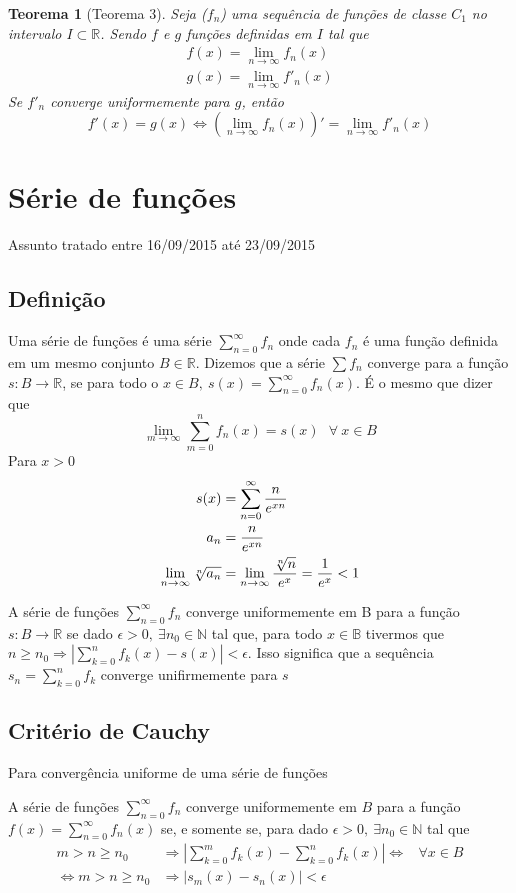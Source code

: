 \documentclass[12pt,openany, letterpaper]{book}
\newtheorem{theorem}{Teorema}[section]
\newcommand{\LI}[1][n]{\lim_{{#1} \rightarrow \infty}}
\newcommand{\soma}[2][n]{\sum_{{#1} = #2}^\infty}
\begin{document}
\begin{theorem}[Teorema 3\label{t:3-3}] 
Seja ($f_n$) uma sequência de funções de classe $C_1$ no intervalo $I \subset \mathds{R}$. Sendo $f$ e $g$ funções definidas em $I$ tal  que \begin{align*}
f(x) = \LI f_n (x) \\
g(x) = \LI f'_n(x)
\end{align*}
Se $f'_n$ converge uniformemente para $g$, então $$f'(x) = g(x) \Longleftrightarrow \left( \LI f_n(x)\right)' = \LI f'_n(x)$$
\end{theorem}

\chapter{Série de funções} {Assunto tratado entre 16/09/2015 até 23/09/2015}
\section{Definição}
\hspace{5mm} Uma série de funções é uma série $\displaystyle{\soma{0} f_n}$ onde cada $f_n$ é uma função definida em um mesmo conjunto $B \in \mathds{R}$. Dizemos que a série $\sum f_n$ converge para a função $s: B \rightarrow \mathds{R}$, se para todo o $x \in B, \ s(x) = \soma{0} f_n(x)$. É o mesmo que dizer que $$\LI[m] \sum_{m=0}^n f_n(x) = s(x) \ \ \  \forall \ x \in B$$
 Para $x > 0$\begin{align*}
 s(x) &= \soma{0} \frac{n}{e^{xn}}\\
 a_n &= {n \over e^{xn}}\\
 \LI \sqrt[n]{a_n} &= \LI {\sqrt[n]{n} \over e^x} = {1 \over e^x} <1
 \end{align*}

A série de funções $\displaystyle{\soma{0} f_n}$ converge uniformemente em B para a função $s: B \rightarrow \mathds{R}$ se dado $\epsilon > 0, \ \exists n_0 \in \mathds{N}$ tal que, para todo $x \in \mathds{B}$ tivermos que $n\geq n_0 \Rightarrow \displaystyle{\left|\sum_{k = 0}^n f_k (x) - s(x)\right| < \epsilon}$. Isso significa que a sequência $s_n = \displaystyle{\sum_{k=0}^n f_k}$ converge unifirmemente para $s$

\section{Critério de Cauchy} {Para convergência uniforme de uma série de funções}

\hspace{5mm} A série de funções $\displaystyle{\soma{0} f_n}$ converge uniformemente em $B$ para a função $\displaystyle{f(x) = \soma{0} f_n(x)}$ se, e somente se, para dado $\epsilon > 0, \ \exists n_0 \in \mathds{N}$ tal que \begin{align*}
m>n \geq n_0 \ &\Rightarrow \left| \sum_{k=0}^m f_k (x) - \sum_{k=0}^n f_k (x)\right|  \Longleftrightarrow & \forall x \in B \\
\Longleftrightarrow m > n \geq n_0 &\Rightarrow |s_m(x) - s_n(x)| < \epsilon
\end{align*}
\end{document}
